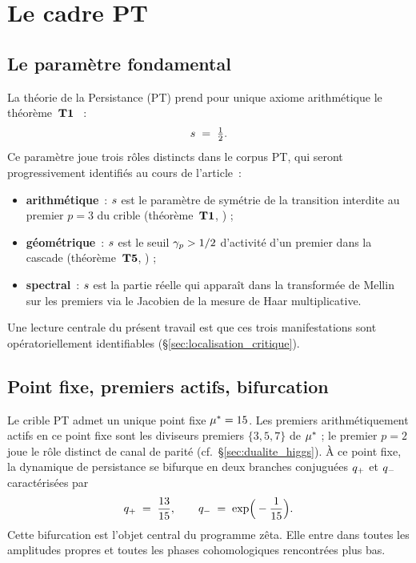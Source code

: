 \section{Le cadre PT}
\label{sec:cadre_pt}

\subsection{Le paramètre fondamental}
\label{sec:parametre}

La théorie de la Persistance (PT) prend pour unique axiome arithmétique
le théorème~$\textbf{T1}$ \cite{PT_M1}~:
\[
s \;=\; \tfrac{1}{2}.
\]
Ce paramètre joue trois rôles distincts dans le corpus PT, qui seront
progressivement identifiés au cours de l'article~:
\begin{itemize}[nosep,leftmargin=*]
\item \textbf{arithmétique}~: $s$ est le paramètre de symétrie de la
  transition interdite au premier $p = 3$ du crible
  (théorème~$\textbf{T1}$, \cite{PT_M1}) ;
\item \textbf{géométrique}~: $s$ est le seuil $\gamma_{p} > 1/2$
  d'activité d'un premier dans la cascade
  (théorème~$\textbf{T5}$, \cite{PT_M3}) ;
\item \textbf{spectral}~: $s$ est la partie réelle qui apparaît dans
  la transformée de Mellin sur les premiers via le Jacobien de la mesure
  de Haar multiplicative.
\end{itemize}

Une lecture centrale du présent travail est que ces trois manifestations
sont opératoriellement identifiables (\S\ref{sec:localisation_critique}).

\subsection{Point fixe, premiers actifs, bifurcation}
\label{sec:point_fixe}

Le crible PT admet un unique point fixe $\mu^{*} = 15$. Les premiers
arithmétiquement actifs en ce point fixe sont les diviseurs premiers
$\{3, 5, 7\}$ de $\mu^{*}$ ; le premier $p = 2$ joue le rôle distinct de
canal de parité (cf.~\S\ref{sec:dualite_higgs}). À ce point fixe, la
dynamique de persistance se bifurque en deux branches conjuguées $q_{+}$
et $q_{-}$ caractérisées par
\begin{equation}
q_{+} \;=\; \dfrac{13}{15}, \qquad
q_{-} \;=\; \exp\!\Big(-\dfrac{1}{15}\Big).
\label{eq:qplusqminus}
\end{equation}
Cette bifurcation est l'objet central du programme zêta. Elle entre dans
toutes les amplitudes propres et toutes les phases cohomologiques
rencontrées plus bas.

